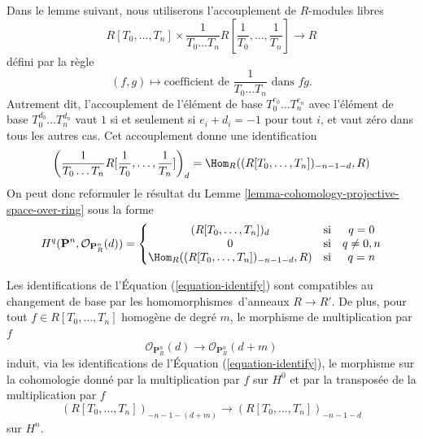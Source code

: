 \noindent
Dans le lemme suivant, nous utiliserons l'accouplement de
$R$-modules libres
$$
R[T_0, \ldots, T_n]
\times
\frac{1}{T_0 \ldots T_n} R[\frac{1}{T_0}, \ldots, \frac{1}{T_n}]
\longrightarrow
R
$$
défini par la règle
$$
(f, g)
\longmapsto
\text{coefficient de }
\frac{1}{T_0 \ldots T_n}
\text{ dans }fg.
$$
Autrement dit, l'accouplement de l'élément de base $T_0^{e_0} \ldots T_n^{e_n}$
avec l'élément de base $T_0^{d_0} \ldots T_n^{d_n}$ vaut $1$ si et seulement
si $e_i + d_i = -1$ pour tout $i$, et vaut zéro dans tous les autres cas.
Cet accouplement donne une identification
$$
\left(\frac{1}{T_0 \ldots T_n} R[\frac{1}{T_0}, \ldots, \frac{1}{T_n}]\right)_d
=
\Hom_R((R[T_0, \ldots, T_n])_{-n - 1 - d}, R)
$$
On peut donc reformuler le résultat du
Lemme \ref{lemma-cohomology-projective-space-over-ring} sous la forme
\begin{equation}
\label{equation-identify}
H^q(\mathbf{P}^n, \mathcal{O}_{\mathbf{P}^n_R}(d)) =
\left\{
\begin{matrix}
(R[T_0, \ldots, T_n])_d & \text{si} & q = 0 \\
0 & \text{si} & q \not = 0, n \\
\Hom_R((R[T_0, \ldots, T_n])_{-n - 1 - d}, R)
& \text{si} & q = n
\end{matrix}
\right.
\end{equation}

\begin{lemma}
\label{lemma-identify-functorially}
Les identifications de l'Équation (\ref{equation-identify}) sont
compatibles au changement de base par les homomorphismes\ d'anneaux $R \to R'$.
De plus, pour tout $f \in R[T_0, \ldots, T_n]$ homogène
de degré $m$, le morphisme de multiplication par $f$
$$
\mathcal{O}_{\mathbf{P}^n_R}(d)
\longrightarrow
\mathcal{O}_{\mathbf{P}^n_R}(d + m)
$$
induit, via les identifications
de l'Équation (\ref{equation-identify}), le morphisme sur la cohomologie donné par la multiplication par
$f$ sur $H^0$ et par la transposée de la multiplication par $f$
$$
(R[T_0, \ldots, T_n])_{-n - 1 - (d + m)}
\longrightarrow
(R[T_0, \ldots, T_n])_{-n - 1 - d}
$$
sur $H^n$.
\end{lemma}

